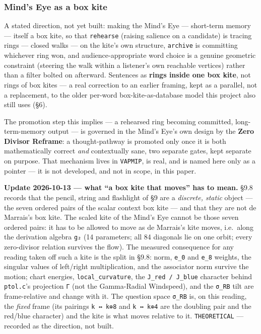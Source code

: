 \documentclass[
  10pt,
]{article}
\begin{document}
\hypertarget{minds-eye-as-a-box-kite}{%
\subsubsection{Mind's Eye as a box kite}\label{minds-eye-as-a-box-kite}}

A stated direction, not yet built: making the Mind's Eye --- short-term
memory --- itself a box kite, so that \texttt{rehearse} (raising
salience on a candidate) is tracing rings --- closed walks --- on the
kite's own structure, \texttt{archive} is committing whichever ring won,
and audience-appropriate word choice is a genuine geometric constraint
(steering the walk within a listener's own reachable vertices) rather
than a filter bolted on afterward. Sentences as \textbf{rings inside one
box kite}, not rings of box kites --- a real correction to an earlier
framing, kept as a parallel, not a replacement, to the older per-word
box-kite-as-database model this project also still uses (§6).

The promotion step this implies --- a rehearsed ring becoming committed,
long-term-memory output --- is governed in the Mind's Eye's own design
by the \textbf{Zero Divisor Reframe}: a thought-pathway is promoted only
once it is both mathematically correct \emph{and} contextually sane, two
separate gates, kept separate on purpose. That mechanism lives in
\texttt{VAPMIP}, is real, and is named here only as a pointer --- it is
not developed, and not in scope, in this paper.

\textbf{Update 2026-10-13 --- what ``a box kite that moves'' has to
mean.} §9.8 records that the pencil, string and flashlight of §9 are a
\emph{discrete, static} object --- the seven ordered pairs of the scalar
context box kite --- and that they are not de Marrais's box kite. The
scaled kite of the Mind's Eye cannot be those seven ordered pairs: it
has to be allowed to move as de Marrais's kite moves, i.e.~along the
derivation algebra \texttt{g₂} (14 parameters; all 84 diagonals lie on
one orbit; every zero-divisor relation survives the flow). The measured
consequence for any reading taken off such a kite is the split in §9.8:
norm, \texttt{e\_0} and \texttt{e\_8} weights, the singular values of
left/right multiplication, and the associator norm survive the motion;
chart energies, \texttt{local\_curvature}, the
\texttt{J\_red\ /\ J\_blue} character behind \texttt{ptol.c}'s
projection \texttt{Γ} (not the Gamma-Radial Windspeed), and the
\texttt{σ\_RB} tilt are frame-relative and change with it. The question
space \texttt{σ\_RB} is, on this reading, the \emph{fixed} frame (its
pairings \texttt{k\ ↔\ k⊕8} and \texttt{k\ ↔\ k⊕4} are the doubling pair
and the red/blue character) and the kite is what moves relative to it.
\texttt{THEORETICAL} --- recorded as the direction, not built.
\end{document}
